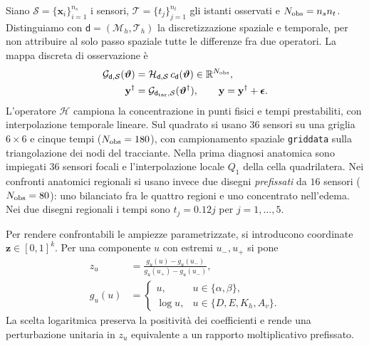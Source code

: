 Siano $\mathcal S=\{\mathbf x_i\}_{i=1}^{n_s}$ i sensori, $\mathcal T=\{t_j\}_{j=1}^{n_t}$ gli istanti osservati e $N_{\rm obs}=n_s n_t$. Distinguiamo con $\mathsf d=(\mathcal M_h,\mathcal T_h)$ la discretizzazione spaziale e temporale, per non attribuire al solo passo spaziale tutte le differenze fra due operatori. La mappa discreta di osservazione è
\begin{equation}
 \begin{aligned}
 \mathcal{G}_{\mathsf d,\mathcal S}(\boldsymbol\vartheta)
  &=\mathcal H_{\mathsf d,\mathcal S}\,c_{\mathsf d}(\boldsymbol\vartheta)
    \in\mathbb{R}^{N_{\rm obs}},\\
 \mathbf y^\dagger
  &=\mathcal{G}_{\mathsf d_{\rm tar},\mathcal S}(\boldsymbol\vartheta^\dagger),
  \qquad \mathbf y=\mathbf y^\dagger+\boldsymbol\epsilon .
 \end{aligned}
 \label{eq:observation}
\end{equation}
L'operatore $\mathcal H$ campiona la concentrazione in punti fisici e tempi prestabiliti, con interpolazione temporale lineare. Sul quadrato si usano $36$ sensori su una griglia $6\times6$ e cinque tempi ($N_{\rm obs}=180$), con campionamento spaziale \texttt{griddata} sulla triangolazione dei nodi del tracciante. Nella prima diagnosi anatomica sono impiegati $36$ sensori focali e l'interpolazione locale $Q_1$ della cella quadrilatera. Nei confronti anatomici regionali si usano invece due disegni \emph{prefissati} da $16$ sensori ($N_{\rm obs}=80$): uno bilanciato fra le quattro regioni e uno concentrato nell'edema. Nei due disegni regionali i tempi sono $t_j=0.12j$ per $j=1,\ldots,5$.

Per rendere confrontabili le ampiezze parametrizzate, si introducono coordinate $\mathbf z\in[0,1]^k$. Per una componente $u$ con estremi $u_-,u_+$ si pone
\begin{equation}
\begin{aligned}
 z_u&=\frac{g_u(u)-g_u(u_-)}{g_u(u_+)-g_u(u_-)},\\[-1pt]
 g_u(u)&=\begin{cases}
   u, & u\in\{\alpha,\beta\},\\
   \log u, & u\in\{D,E,K_h,A_v\}.
 \end{cases}
\end{aligned}
 \label{eq:normalized-parameters}
\end{equation}
La scelta logaritmica preserva la positività dei coefficienti e rende una perturbazione unitaria in $z_u$ equivalente a un rapporto moltiplicativo prefissato.

